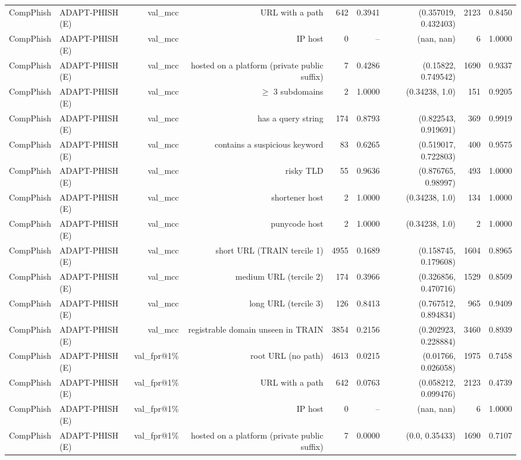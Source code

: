 \begin{table}[t]
\begin{tabular}{llrrrrrrr}
CompPhish & ADAPT-PHISH (E) & val\_mcc & URL with a path & 642 & 0.3941 & (0.357019, 0.432403) & 2123 & 0.8450 \\
CompPhish & ADAPT-PHISH (E) & val\_mcc & IP host & 0 & -- & (nan, nan) & 6 & 1.0000 \\
CompPhish & ADAPT-PHISH (E) & val\_mcc & hosted on a platform (private public suffix) & 7 & 0.4286 & (0.15822, 0.749542) & 1690 & 0.9337 \\
CompPhish & ADAPT-PHISH (E) & val\_mcc & $\geq$ 3 subdomains & 2 & 1.0000 & (0.34238, 1.0) & 151 & 0.9205 \\
CompPhish & ADAPT-PHISH (E) & val\_mcc & has a query string & 174 & 0.8793 & (0.822543, 0.919691) & 369 & 0.9919 \\
CompPhish & ADAPT-PHISH (E) & val\_mcc & contains a suspicious keyword & 83 & 0.6265 & (0.519017, 0.722803) & 400 & 0.9575 \\
CompPhish & ADAPT-PHISH (E) & val\_mcc & risky TLD & 55 & 0.9636 & (0.876765, 0.98997) & 493 & 1.0000 \\
CompPhish & ADAPT-PHISH (E) & val\_mcc & shortener host & 2 & 1.0000 & (0.34238, 1.0) & 134 & 1.0000 \\
CompPhish & ADAPT-PHISH (E) & val\_mcc & punycode host & 2 & 1.0000 & (0.34238, 1.0) & 2 & 1.0000 \\
CompPhish & ADAPT-PHISH (E) & val\_mcc & short URL (TRAIN tercile 1) & 4955 & 0.1689 & (0.158745, 0.179608) & 1604 & 0.8965 \\
CompPhish & ADAPT-PHISH (E) & val\_mcc & medium URL (tercile 2) & 174 & 0.3966 & (0.326856, 0.470716) & 1529 & 0.8509 \\
CompPhish & ADAPT-PHISH (E) & val\_mcc & long URL (tercile 3) & 126 & 0.8413 & (0.767512, 0.894834) & 965 & 0.9409 \\
CompPhish & ADAPT-PHISH (E) & val\_mcc & registrable domain unseen in TRAIN & 3854 & 0.2156 & (0.202923, 0.228884) & 3460 & 0.8939 \\
CompPhish & ADAPT-PHISH (E) & val\_fpr@1\% & root URL (no path) & 4613 & 0.0215 & (0.01766, 0.026058) & 1975 & 0.7458 \\
CompPhish & ADAPT-PHISH (E) & val\_fpr@1\% & URL with a path & 642 & 0.0763 & (0.058212, 0.099476) & 2123 & 0.4739 \\
CompPhish & ADAPT-PHISH (E) & val\_fpr@1\% & IP host & 0 & -- & (nan, nan) & 6 & 1.0000 \\
CompPhish & ADAPT-PHISH (E) & val\_fpr@1\% & hosted on a platform (private public suffix) & 7 & 0.0000 & (0.0, 0.35433) & 1690 & 0.7107 \\

\end{tabular}
\end{table}
